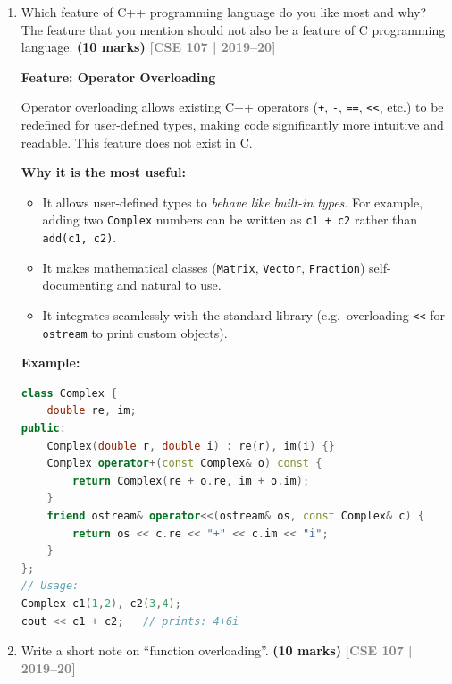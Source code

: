 \documentclass[12pt,a3paper]{article}
\newcommand{\yr}[1]{\hfill\textcolor{gray}{\small\textbf{[#1]}}}
\newcommand{\mk}[1]{\textcolor{orange!70!black}{\small\textbf{(#1 marks)}}}
\begin{document}
\begin{enumerate}
\begin{tcolorbox}[enhanced,breakable,ansbox,colback=cA!4,colframe=cA,
  boxrule=0.8pt,arc=5pt,
  title={\textbf{Answer}},fonttitle=\bfseries\color{white},colbacktitle=cA]
\end{tcolorbox}

\item Which feature of C++ programming language do you like most and why? The feature that you mention should not also be a feature of C programming language. \mk{10}
\yr{CSE 107 | 2019--20}

\begin{tcolorbox}[enhanced,breakable,ansbox,colback=cA!4,colframe=cA,
  boxrule=0.8pt,arc=5pt,
  title={\textbf{Answer}},fonttitle=\bfseries\color{white},colbacktitle=cA]

\textbf{Feature: Operator Overloading}

Operator overloading allows existing C++ operators
(\texttt{+}, \texttt{-}, \texttt{==}, \texttt{<<}, etc.) to be
redefined for user-defined types, making code significantly more
intuitive and readable.  This feature does not exist in C.

\textbf{Why it is the most useful:}
\begin{itemize}[itemsep=2pt]
  \item It allows user-defined types to \emph{behave like built-in
    types}.  For example, adding two \texttt{Complex} numbers can be
    written as \texttt{c1 + c2} rather than \texttt{add(c1, c2)}.
  \item It makes mathematical classes (\texttt{Matrix},
    \texttt{Vector}, \texttt{Fraction}) self-documenting and natural
    to use.
  \item It integrates seamlessly with the standard library
    (e.g.\ overloading \texttt{<<} for \texttt{ostream} to print
    custom objects).
\end{itemize}

\textbf{Example:}
\begin{lstlisting}[language=C++]
class Complex {
    double re, im;
public:
    Complex(double r, double i) : re(r), im(i) {}
    Complex operator+(const Complex& o) const {
        return Complex(re + o.re, im + o.im);
    }
    friend ostream& operator<<(ostream& os, const Complex& c) {
        return os << c.re << "+" << c.im << "i";
    }
};
// Usage:
Complex c1(1,2), c2(3,4);
cout << c1 + c2;   // prints: 4+6i
\end{lstlisting}

\end{tcolorbox}

\item Write a short note on ``function overloading''. \mk{10}
\yr{CSE 107 | 2019--20}


\end{enumerate}
\end{document}
